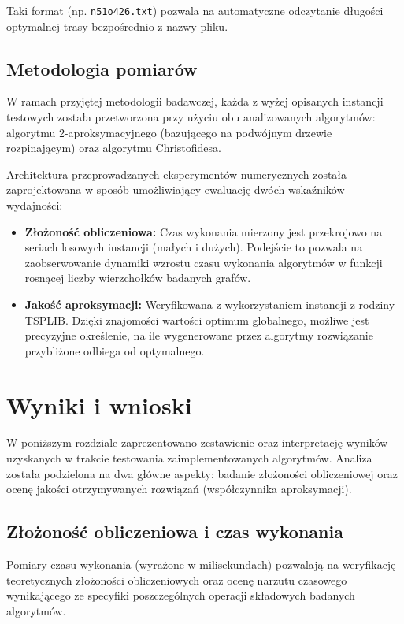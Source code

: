\documentclass{article}
\theoremstyle{definition}
\theoremstyle{plain}
\theoremstyle{remark}
\begin{document}
\noindent
Taki format (np. \texttt{n51o426.txt}) pozwala na automatyczne odczytanie długości optymalnej trasy bezpośrednio z nazwy pliku.

\subsection{Metodologia pomiarów}

W ramach przyjętej metodologii badawczej, każda z wyżej opisanych instancji testowych została przetworzona przy użyciu obu analizowanych algorytmów: algorytmu 2-aproksymacyjnego (bazującego na podwójnym drzewie rozpinającym) oraz algorytmu Christofidesa. 

Architektura przeprowadzanych eksperymentów numerycznych została zaprojektowana w sposób umożliwiający ewaluację dwóch wskaźników wydajności:

\begin{itemize}
    \item \textbf{Złożoność obliczeniowa:} Czas wykonania mierzony jest przekrojowo na seriach losowych instancji (małych i dużych). Podejście to pozwala na zaobserwowanie dynamiki wzrostu czasu wykonania algorytmów w funkcji rosnącej liczby wierzchołków badanych grafów.
    \item \textbf{Jakość aproksymacji:} Weryfikowana z wykorzystaniem instancji z rodziny TSPLIB. Dzięki znajomości wartości optimum globalnego, możliwe jest precyzyjne określenie, na ile wygenerowane przez algorytmy rozwiązanie przybliżone odbiega od optymalnego.
\end{itemize}

\newpage
\section{Wyniki i wnioski}
\label{sec:wyniki_i_wnioski}

W poniższym rozdziale zaprezentowano zestawienie oraz interpretację wyników uzyskanych w trakcie testowania zaimplementowanych algorytmów. Analiza została podzielona na dwa główne aspekty: badanie złożoności obliczeniowej oraz ocenę jakości otrzymywanych rozwiązań (współczynnika aproksymacji).

\subsection{Złożoność obliczeniowa i czas wykonania}
\label{subsec:zlozonosc_czasowa}

Pomiary czasu wykonania (wyrażone w milisekundach) pozwalają na weryfikację teoretycznych złożoności obliczeniowych oraz ocenę narzutu czasowego wynikającego ze specyfiki poszczególnych operacji składowych badanych algorytmów.
\end{document}
